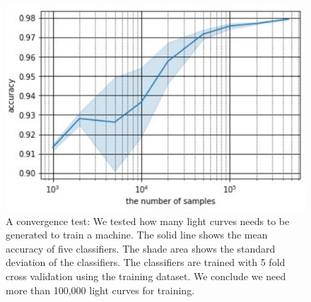 \documentclass[useamsfonts]{pasj01}
\begin{document}
\begin{figure}[ht]
  \begin{center}
     \includegraphics[width=\columnwidth]{figures/size_accuracy.eps}
  \end{center}
  \caption{%
A convergence test: We tested how many light curves needs to be generated to train a machine. 
The solid line shows the mean accuracy of five classifiers. The shade area shows the standard deviation of the classifiers. The classifiers are trained with 5 fold cross validation using the training dataset.  We conclude we need more than 100,000 light curves for training.
  }%
  \label{fig:size_convergence_test}
\end{figure}

\begin{table}[ht]
  \label{tb:hp}
\end{table}
\end{document}
